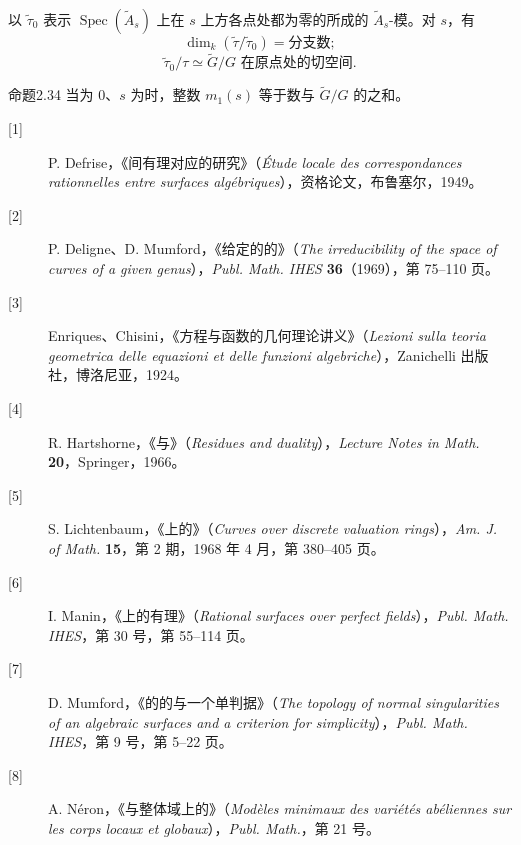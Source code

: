 以 $\widetilde\tau_0$ 表示 $\operatorname{Spec}(\widetilde A_s)$ 上在 $s$ 上方各点处都为零的所成的 $\widetilde A_s$-模。对 $s$，有
\[
\dim_k(\widetilde\tau/\widetilde\tau_0)=\text{分支数};
\]
\[
\widetilde\tau_0/\tau\simeq\widetilde G/G\text{ 在原点处的切空间}.
\]
\begin{SGAresult}{命题}{2.34}
当为 $0$、$s$ 为时，整数 $m_1(s)$ 等于数与 $\widetilde G/G$ 的之和。
\end{SGAresult}

\begin{description}
\item[{[1]}] P. Defrise，《间有理对应的研究》（\textit{Étude locale des correspondances rationnelles entre surfaces algébriques}），资格论文，布鲁塞尔，1949。
\item[{[2]}] P. Deligne、D. Mumford，《给定的的》（\textit{The irreducibility of the space of curves of a given genus}），\textit{Publ. Math. IHES} \textbf{36}（1969），第 75--110 页。
\item[{[3]}] Enriques、Chisini，《方程与函数的几何理论讲义》（\textit{Lezioni sulla teoria geometrica delle equazioni et delle funzioni algebriche}），Zanichelli 出版社，博洛尼亚，1924。
\item[{[4]}] R. Hartshorne，《与》（\textit{Residues and duality}），\textit{Lecture Notes in Math.} \textbf{20}，Springer，1966。
\item[{[5]}] S. Lichtenbaum，《上的》（\textit{Curves over discrete valuation rings}），\textit{Am. J. of Math.} \textbf{15}，第 2 期，1968 年 4 月，第 380--405 页。
\item[{[6]}] I. Manin，《上的有理》（\textit{Rational surfaces over perfect fields}），\textit{Publ. Math. IHES}，第 30 号，第 55--114 页。
\item[{[7]}] D. Mumford，《的的与一个单判据》（\textit{The topology of normal singularities of an algebraic surfaces and a criterion for simplicity}），\textit{Publ. Math. IHES}，第 9 号，第 5--22 页。
\item[{[8]}] A. Néron，《与整体域上的》（\textit{Modèles minimaux des variétés abéliennes sur les corps locaux et globaux}），\textit{Publ. Math.}，第 21 号。
\end{description}
